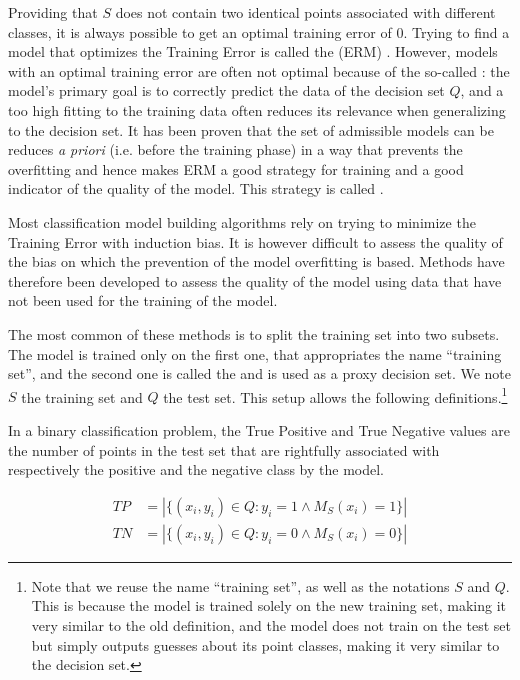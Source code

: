 Providing that $S$ does not contain two identical points associated with different classes, it is always possible to get an optimal training error of $0$. Trying to find a model that optimizes the Training Error is called the  (ERM) \cite{shalev-shwartz2014_UnderstandingMachineLearning}. However, models with an optimal training error are often not optimal because of the so-called : the model's primary goal is to correctly predict the data of the decision set $Q$, and a too high fitting to the training data often reduces its relevance when generalizing to the decision set. It has been proven that the set of admissible models can be reduces \textit{a priori} (i.e. before the training phase) in a way that prevents the overfitting and hence makes ERM a good strategy for training and a good indicator of the quality of the model. This strategy is called  \cite{shalev-shwartz2014_UnderstandingMachineLearning}.

Most classification model building algorithms rely on trying to minimize the Training Error with induction bias. It is however difficult to assess the quality of the bias on which the prevention of the model overfitting is based. Methods have therefore been developed to assess the quality of the model using data that have not been used for the training of the model.

The most common of these methods is to split the training set into two subsets. The model is trained only on the first one, that appropriates the name “training set”, and the second one is called the  and is used as a proxy decision set. We note $S$ the training set and $Q$ the test set. This setup allows the following definitions.\footnote{Note that we reuse the name “training set”, as well as the notations $S$ and $Q$. This is because the model is trained solely on the new training set, making it very similar to the old definition, and the model does not train on the test set but simply outputs guesses about its point classes, making it very similar to the decision set.}

\begin{definition}
In a binary classification problem, the True Positive and True Negative values are the number of points in the test set that are rightfully associated with respectively the positive and the negative class by the model.

\begin{equation}
    \begin{array}{ll}
         TP & = |\{(x_i, y_i)\in Q: y_i = 1 \land M_S(x_i) = 1\}| \\
         TN & = |\{(x_i, y_i)\in Q: y_i = 0 \land M_S(x_i) = 0\}|
    \end{array}
\end{equation}
\end{definition}

